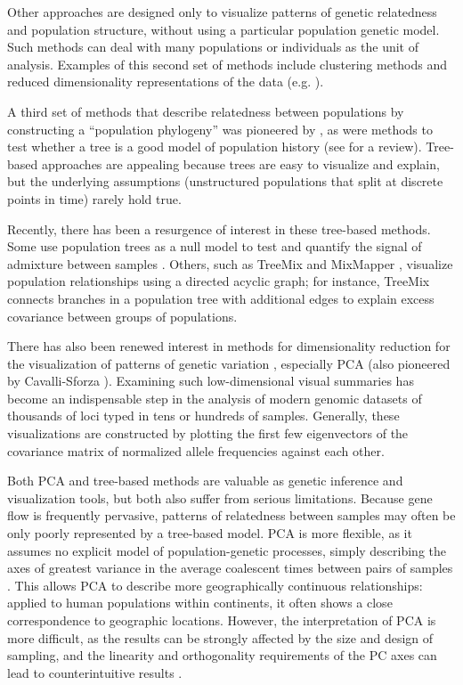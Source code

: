 \documentclass[10pt,letterpaper]{article}
\begin{document}
Other approaches are designed only to visualize patterns of genetic relatedness and population structure,
without using a particular population genetic model.
Such methods can deal with many populations or individuals as the unit of analysis. 
Examples of this second set of methods include clustering methods \cite{STRUCTURE, ADMIXTURE, FINESTRUCTURE} 
and reduced dimensionality representations of the data (e.g. \cite{cavallisforza1994, Patterson2006, price2006eigenstrat}).  

A third set of methods that describe relatedness between populations by constructing a ``population phylogeny''
was pioneered by \cite{cavallisforza_edwards1967}, 
as were methods to test whether a tree is a good model of population history \cite{CavalliSforza1975} (see \cite{Felsenstein1982} for a review).
Tree-based approaches are appealing because trees are easy to visualize and explain,
but the underlying assumptions (unstructured populations that split at discrete points in time)
rarely hold true.
 
Recently, there has been a resurgence of interest in these tree-based methods.  
Some use population trees as a null model to test and quantify the signal of admixture between samples \cite{reich_india_2009}.  
Others, such as TreeMix \cite{Treemix} and MixMapper \cite{lipson_mixmapper_2013}, 
visualize population relationships using a directed acyclic graph;
for instance, TreeMix connects branches in a population tree with additional edges
to explain excess covariance between groups of populations.

There has also been renewed interest in methods for dimensionality reduction
for the visualization of patterns of genetic variation \cite{Patterson2006},
especially PCA (also pioneered by Cavalli-Sforza \cite{menozzi1978synthetic}). 
Examining such low-dimensional visual summaries has become an indispensable step in
the analysis of modern genomic datasets of thousands of loci typed in tens or hundreds of samples.
Generally, these visualizations are constructed by plotting the first few eigenvectors of the covariance matrix
of normalized allele frequencies against each other.

Both PCA and tree-based methods are valuable as genetic inference and visualization tools, but both also suffer from serious limitations.  
Because gene flow is frequently pervasive, patterns of relatedness between samples may often be only poorly represented by a tree-based model.  
PCA is more flexible, as it assumes no explicit model of population-genetic processes, 
simply describing the axes of greatest variance in the average coalescent times between pairs of samples \cite{mcvean_genealogical_2009}. 
This allows PCA to describe more geographically continuous relationships: 
applied to human populations within continents, it often shows a close correspondence to geographic locations\cite{novembre_genes_2008,wang_quantitative_2012}.  
However, the interpretation of PCA is more difficult, as the results can be strongly affected by the size and design of sampling, 
and the linearity and orthogonality requirements of the PC axes can lead to counterintuitive results \cite{novembre_interpreting_2008, Francois_2010_surfing, Frichot2012}.
\end{document}
